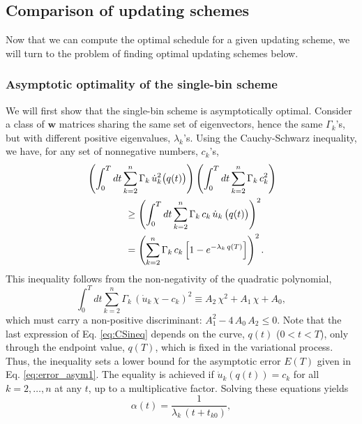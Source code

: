 \documentclass[reprint, superscriptaddress, floatfix]{revtex4-1}
\newcommand{\note}[1]{{\color{DarkGreen}\footnotesize \textsc{Note.} #1}}
\newcommand{\Err}{E}
\begin{document}
\subsection{\label{sec:cmpschemes}
Comparison of updating schemes}


Now that we can compute the optimal schedule
for a given updating scheme,
we will turn to the problem of finding
optimal updating schemes below.


\subsubsection{\label{sec:optWL}
Asymptotic optimality of the single-bin scheme}



We will first show
that the single-bin scheme is asymptotically optimal.
%
Consider a class of $\mathbf w$ matrices
sharing the same set of eigenvectors,
hence the same $\Gamma_k$'s,
but with different positive eigenvalues,
$\lambda_k$'s.
%
Using the Cauchy-Schwarz inequality, we have,
for any set of nonnegative numbers, $c_k$'s,
%
\begin{align}
&
\left(
  \int_0^T dt
    \sum_{k = 2}^n
      \Gamma_k \, \dot u_k^2\bigl( q(t) \bigr)
\right)
%
\left(
  \int_0^T dt
    \sum_{k = 2}^n
      \Gamma_k \, c_k^2
\right)
%
\notag
\\
&
\qquad \qquad
\ge
\left(
  \int_0^T dt
    \sum_{k = 2}^n
      \Gamma_k \, c_k \, \dot u_k \, \bigl( q(t) \bigr)
\right)^2
\notag
\\
&
\qquad \qquad
=
\left(
  \sum_{k = 2}^n \Gamma_k \, c_k
    \left[
      1 - e^{ -\lambda_k \, q(T) }
    \right]
\right)^2.
\label{eq:CSineq}
\end{align}
%
This inequality follows from the non-negativity of
the quadratic polynomial,
$$
\int_0^T
  dt \sum_{k = 2}^n \Gamma_k \,
    \left( \dot u_k \, \chi - c_k \right)^2
  \equiv
  A_2 \, \chi^2 + A_1 \, \chi + A_0
  ,
$$
which must carry a non-positive discriminant:
$A_1^2 - 4 \, A_0 \, A_2 \le 0$.
%
Note that the last expression of Eq. \eqref{eq:CSineq}
depends on the curve, $q(t)$ ($0 < t < T$),
only through the endpoint value, $q(T)$,
which is fixed in the variational process.
%
Thus, the inequality sets a lower bound
for the asymptotic error $\Err(T)$
given in Eq. \eqref{eq:error_asym1}.
%
The equality is achieved
if $\dot u_k\left( q(t) \right) = c_k$
for all $k = 2, \dots, n$ at any $t$,
up to a multiplicative factor.
%
Solving these equations yields
%
\begin{equation}
  \alpha(t) = \frac{              1             }
                   { \lambda_k \, (t + t_{k0} ) },
\label{eq:alpha_invtk}
\end{equation}
\end{document}
